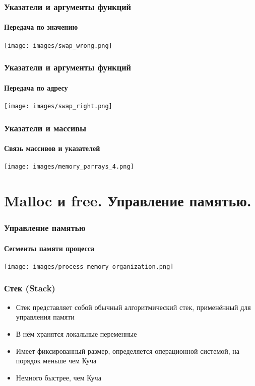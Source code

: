 \documentclass[12pt,pdf,hyperref={unicode}]{beamer}
\begin{document}
\begin{frame}[fragile]
\frametitle{Указатели и аргументы функций} 
\framesubtitle{Передача по значению}
\begin{center}
\texttt{[image: images/swap\_wrong.png]}
\end{center}
\end{frame}

\begin{frame}[fragile]
\frametitle{Указатели и аргументы функций} 
\framesubtitle{Передача по адресу}
\begin{center}
\texttt{[image: images/swap\_right.png]}
\end{center}
\end{frame}



\begin{frame}[fragile]
\frametitle{Указатели и массивы} 
\framesubtitle{Связь массивов и указателей}
\begin{center}
\texttt{[image: images/memory\_parrays\_4.png]}
\end{center}
\end{frame}






\section{Malloc и free. Управление памятью.}


\begin{frame}[fragile]
\frametitle{Управление памятью} 
\framesubtitle{Сегменты памяти процесса}
\begin{center}
\texttt{[image: images/process\_memory\_organization.png]}
\end{center}
\end{frame}

\begin{frame}[fragile]
\frametitle{Стек (Stack)} 
\begin{itemize}
\item Стек представляет собой обычный алгоритмический стек, применённый для управления памяти
\item В нём хранятся локальные переменные
\item Имеет фиксированный размер, определяется операционной системой, на порядок меньше чем Куча
\item Немного быстрее, чем Куча
\end{itemize}
\end{frame}
\end{document}
